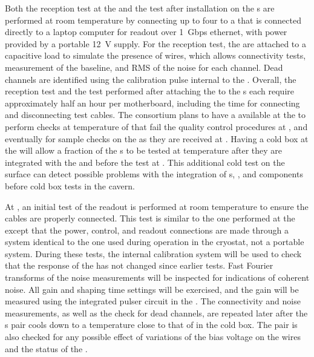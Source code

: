 Both the reception test at the  and the test after 
installation on the s are performed at room temperature 
by connecting up to four  to a  that is 
connected directly to a laptop computer for readout over 1~Gbps
ethernet, with power provided by a portable 12~V supply. For 
the reception test, the  are attached to a capacitive 
load to simulate the presence of wires, which allows connectivity 
tests, measurement of the baseline, and RMS of the noise for 
each channel. Dead channels are identified using the calibration 
pulse internal to the  . Overall, the reception 
test and the test performed after attaching the  to the 
s each require approximately half an hour per motherboard, 
including  the time for connecting and disconnecting test cables.
The  consortium plans to have a  available
at the  to perform checks at \lntwo temperature
of  that fail the quality control procedures at ,
and eventually for sample checks on the  as they are received
at . Having a cold box at the 
will allow a fraction of the s to be tested at
\lntwo temperature after they are integrated with the 
and  before the test at 
. This additional cold test on the surface can
detect possible problems with the integration of s, ,
and  components before cold
box tests in the  cavern.

At , an initial test of the readout is performed at room temperature to
ensure the cables are properly connected. This test is similar to the one
performed at the  except that the power, control, and readout
connections are made through a system identical to the one used during
operation in the cryostat, not a portable system.
During these tests, the internal calibration system will be used to check
that the response of the  has not changed since earlier
tests. Fast Fourier transforms of the noise measurements will be inspected
for indications of coherent noise. All  gain and shaping time
settings will be exercised, and the gain will be measured using the
integrated pulser circuit in the  . 
The connectivity and noise measurements, as well as the check for dead
channels, are repeated later after the s pair cools down
to a temperature close to that of \lntwo in the cold box. The pair is also 
checked for any possible effect of variations of the bias voltage
on the  wires and the status of the .


